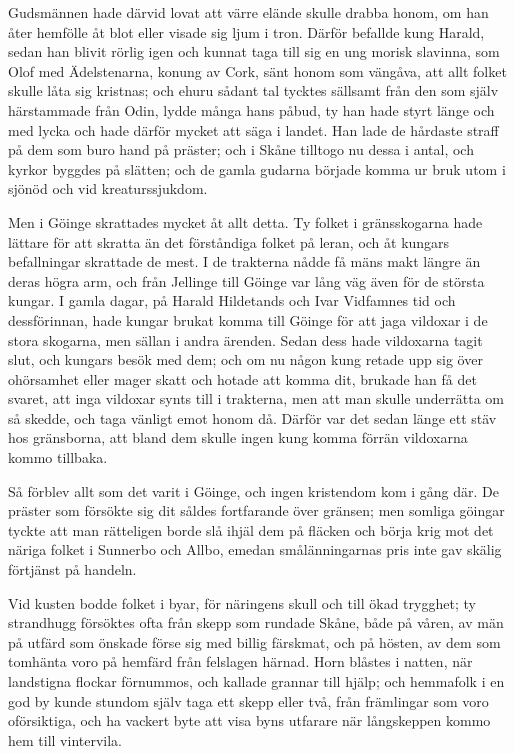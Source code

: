 \initial Gudsmännen hade därvid lovat att värre elände skulle drabba honom, om han åter hemfölle åt blot eller visade sig ljum i tron. Därför befallde kung Harald, sedan han blivit rörlig igen och kunnat taga till sig en ung morisk slavinna, som Olof med Ädelstenarna, konung av Cork, sänt honom som vängåva, att allt folket skulle låta sig kristnas; och ehuru sådant tal tycktes sällsamt från den som själv härstammade från Odin, lydde många hans påbud, ty han hade styrt länge och med lycka och hade därför mycket att säga i landet. Han lade de hårdaste straff på dem som buro hand på präster; och i Skåne tilltogo nu dessa i antal, och kyrkor byggdes på slätten; och de gamla gudarna började komma ur bruk utom i sjönöd och vid kreaturssjukdom.

\initial Men i Göinge skrattades mycket åt allt detta. Ty folket i gränsskogarna hade lättare för att skratta än det förståndiga folket på leran, och åt kungars befallningar skrattade de mest. I de trakterna nådde få mäns makt längre än deras högra arm, och från Jellinge till Göinge var lång väg även för de största kungar. I gamla dagar, på Harald Hildetands och Ivar Vidfamnes tid och dessförinnan, hade kungar brukat komma till Göinge för att jaga vildoxar i de stora skogarna, men sällan i andra ärenden. Sedan dess hade vildoxarna tagit slut, och kungars besök med dem; och om nu någon kung retade upp sig över ohörsamhet eller mager skatt och hotade att komma dit, brukade han få det svaret, att inga vildoxar synts till i trakterna, men att man skulle underrätta om så skedde, och taga vänligt emot honom då. Därför var det sedan länge ett stäv hos gränsborna, att bland dem skulle ingen kung komma förrän vildoxarna kommo tillbaka.

\initial Så förblev allt som det varit i Göinge, och ingen kristendom kom i gång där. De präster som försökte sig dit såldes fortfarande över gränsen; men somliga göingar tyckte att man rätteligen borde slå ihjäl dem på fläcken och börja krig mot det näriga folket i Sunnerbo och Allbo, emedan smålänningarnas pris inte gav skälig förtjänst på handeln.

%
%


\initial Vid kusten bodde folket i byar, för näringens skull och till ökad trygghet; ty strandhugg försöktes ofta från skepp som rundade Skåne, både på våren, av män på utfärd som önskade förse sig med billig färskmat, och på hösten, av dem som tomhänta voro på hemfärd från felslagen härnad. Horn blåstes i natten, när landstigna flockar förnummos, och kallade grannar till hjälp; och hemmafolk i en god by kunde stundom själv taga ett skepp eller två, från främlingar som voro oförsiktiga, och ha vackert byte att visa byns utfarare när långskeppen kommo hem till vintervila.

